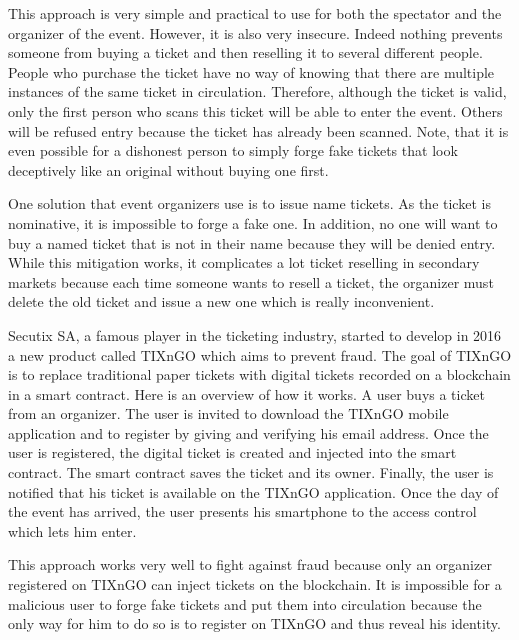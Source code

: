 \documentclass[a4paper,11pt,oneside]{report}
\begin{document}
This approach is very simple and practical to use for both the spectator and the organizer of the event. However, it is also very insecure. Indeed nothing prevents someone from buying a ticket and then reselling it to several different people. People who purchase the ticket have no way of knowing that there are multiple instances of the same ticket in circulation. Therefore, although the ticket is valid, only the first person who scans this ticket will be able to enter the event. Others will be refused entry because the ticket has already been scanned. Note, that it is even possible for a dishonest person to simply forge fake tickets that look deceptively like an original without buying one first.

One solution that event organizers use is to issue name tickets. As the ticket is nominative, it is impossible to forge a fake one. In addition, no one will want to buy a named ticket that is not in their name because they will be denied entry. While this mitigation works, it complicates a lot ticket reselling in secondary markets because each time someone wants to resell a ticket, the organizer must delete the old ticket and issue a new one which is really inconvenient.

Secutix SA, a famous player in the ticketing industry, started to develop in 2016 a new product called TIXnGO which aims to prevent fraud. The goal of TIXnGO is to replace traditional paper tickets with digital tickets recorded on a blockchain in a smart contract. Here is an overview of how it works. A user buys a ticket from an organizer. The user is invited to download the TIXnGO mobile application and to register by giving and verifying his email address. Once the user is registered, the digital ticket is created and injected into the smart contract. The smart contract saves the ticket and its owner. Finally, the user is notified that his ticket is available on the TIXnGO application. Once the day of the event has arrived, the user presents his smartphone to the access control which lets him enter.

This approach works very well to fight against fraud because only an organizer registered on TIXnGO can inject tickets on the blockchain. It is impossible for a malicious user to forge fake tickets and put them into circulation because the only way for him to do so is to register on TIXnGO and thus reveal his identity.
\end{document}

